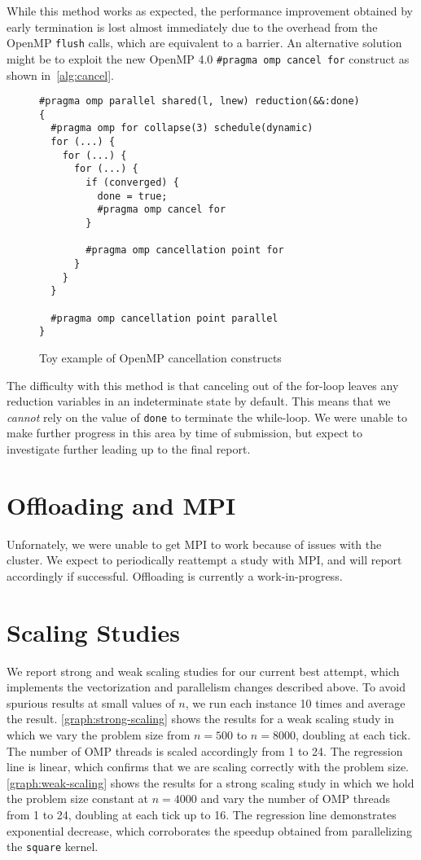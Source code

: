 \documentclass{scrartcl}
\begin{document}
  While this method works as expected, the performance improvement obtained by early termination is lost almost immediately due to the overhead from the OpenMP \texttt{flush} calls, which are equivalent to a barrier. An alternative solution might be to exploit the new OpenMP 4.0 \texttt{\#pragma omp cancel for} construct as shown in~\autoref{alg:cancel}.
  \begin{figure}[ht!]
    \begin{lstlisting}
#pragma omp parallel shared(l, lnew) reduction(&&:done)
{
  #pragma omp for collapse(3) schedule(dynamic)
  for (...) {
    for (...) {
      for (...) {
        if (converged) {
          done = true;
          #pragma omp cancel for
        }

        #pragma omp cancellation point for
      }
    }
  }

  #pragma omp cancellation point parallel
}
    \end{lstlisting}
    \caption{Toy example of OpenMP cancellation constructs\label{alg:cancel}}
  \end{figure}

  The difficulty with this method is that canceling out of the for-loop leaves any reduction variables in an indeterminate state by default. This means that we \emph{cannot} rely on the value of \texttt{done} to terminate the while-loop. We were unable to make further progress in this area by time of submission, but expect to investigate further leading up to the final report.

  \section{Offloading and MPI}
  Unfornately, we were unable to get MPI to work because of issues with the cluster. We expect to periodically reattempt a study with MPI, and will report accordingly if successful. Offloading is currently a work-in-progress.

  \section{Scaling Studies}
  We report strong and weak scaling studies for our current best attempt, which implements the vectorization and parallelism changes described above. To avoid spurious results at small values of $n$, we run each instance 10 times and average the result. \autoref{graph:strong-scaling} shows the results for a weak scaling study in which we vary the problem size from $n = 500$ to $n = 8000$, doubling at each tick. The number of OMP threads is scaled accordingly from 1 to 24. The regression line is linear, which confirms that we are scaling correctly with the problem size. \autoref{graph:weak-scaling} shows the results for a strong scaling study in which we hold the problem size constant at $n = 4000$ and vary the number of OMP threads from 1 to 24, doubling at each tick up to 16. The regression line demonstrates exponential decrease, which corroborates the speedup obtained from parallelizing the \texttt{square} kernel.
\end{document}

